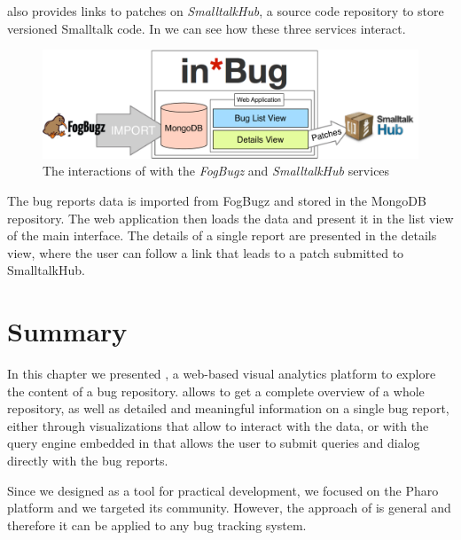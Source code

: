 \ib also provides links to patches on \emph{SmalltalkHub}, a source code repository to store versioned Smalltalk code.
In  we can see how these three services interact.

\begin{figure}[t]
\center
\includegraphics[width=.95\linewidth]{Images/visualize/inbug-ecosystem.pdf}
\caption{The interactions of \ib with the \emph{FogBugz} and \emph{SmalltalkHub} services}
\label{fig-inbug-ecosystem}
\end{figure}


The bug reports data is imported from FogBugz and stored in the MongoDB repository.
The web application then loads the data and present it in the list view of the main interface.
The details of a single report are presented in the details view, where the user can follow a link that leads to a patch submitted to SmalltalkHub.
%

\section{Summary}

In this chapter we presented \ib, a web-based visual analytics platform to explore the content of a bug repository.
\ib allows to get a complete overview of a whole repository, as well as detailed and meaningful information on a single bug report, either through visualizations that allow to interact with the data, or with the query engine embedded in \ib that allows the user to submit queries and dialog directly with the bug reports.


Since we designed \ib as a tool for practical development, we focused on the Pharo platform and we targeted its community.
However, the approach of \ib is general and therefore it can be applied to any bug tracking system.

